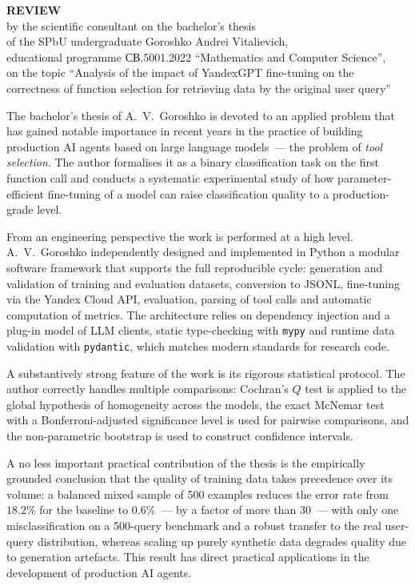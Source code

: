 \documentclass[12pt,a4paper]{article}
\begin{document}
\begin{center}
\Large\textbf{REVIEW}\\[0.3em]
\normalsize by the scientific consultant on the bachelor's thesis\\
of the SPbU undergraduate Goroshko Andrei Vitalievich,\\
educational programme \mbox{СВ.5001.2022} ``Mathematics and Computer Science'',\\
on the topic ``Analysis of the impact of YandexGPT fine-tuning on the correctness of function selection for retrieving data by the original user query''
\end{center}

\vspace{0.8em}

The bachelor's thesis of A.~V.~Goroshko is devoted to an applied
problem that has gained notable importance in recent years in the
practice of building production AI agents based on large language
models~--- the problem of \textit{tool selection}. The author
formalises it as a binary classification task on the first function
call and conducts a systematic experimental study of how
parameter-efficient fine-tuning of a model can raise classification
quality to a production-grade level.

From an engineering perspective the work is performed at a high level.
A.~V.~Goroshko independently designed and implemented in Python a
modular software framework that supports the full reproducible cycle:
generation and validation of training and evaluation datasets,
conversion to JSONL, fine-tuning via the Yandex Cloud API, evaluation,
parsing of tool calls and automatic computation of metrics. The
architecture relies on dependency injection and a plug-in model of
LLM clients, static type-checking with \texttt{mypy} and runtime data
validation with \texttt{pydantic}, which matches modern standards for
research code.

A substantively strong feature of the work is its rigorous
statistical protocol. The author correctly handles multiple
comparisons: Cochran's $Q$ test is applied to the global hypothesis
of homogeneity across the models, the exact McNemar test with a
Bonferroni-adjusted significance level is used for pairwise
comparisons, and the non-parametric bootstrap is used to construct
confidence intervals.

A no less important practical contribution of the thesis is the
empirically grounded conclusion that the quality of training data
takes precedence over its volume: a balanced mixed sample of 500
examples reduces the error rate from $18.2\%$ for the baseline to
$0.6\%$~--- by a factor of more than $30$~--- with only one
misclassification on a 500-query benchmark and a robust transfer to
the real user-query distribution, whereas scaling up purely synthetic
data degrades quality due to generation artefacts. This result has
direct practical applications in the development of production AI
agents.
\end{document}
